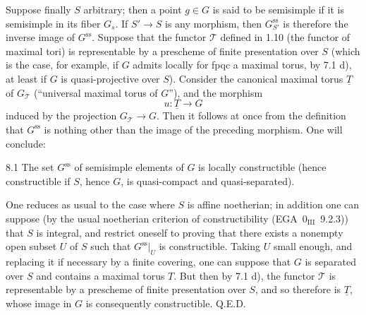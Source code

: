 Suppose finally $S$ arbitrary; then a point $g\in G$ is said to be semisimple if it is semisimple in its fiber $G_s$. If $S'\to S$ is any morphism, then $G^{\mathrm{ss}}_{S'}$ is therefore the inverse image of $G^{\mathrm{ss}}$. Suppose that the functor $\mathscr T$ defined in 1.10 (the functor of maximal tori) is representable by a prescheme of finite presentation over $S$ (which is the case, for example, if $G$ admits locally for fpqc a maximal torus, by 7.1 d), at least if $G$ is quasi-projective over $S$). Consider the canonical maximal torus $\underline T$ of $G_{\mathscr T}$ (``universal maximal torus of $G$''), and the morphism
\[
u:\underline T\to G
\]
induced by the projection $G_{\mathscr T}\to G$. Then it follows at once from the definition that $G^{\mathrm{ss}}$ is nothing other than the image of the preceding morphism. One will conclude:
\begin{proposition}{8.1}\label{XII.8.1}
The set $G^{\mathrm{ss}}$ of semisimple elements of $G$ is locally constructible (hence constructible if $S$, hence $G$, is quasi-compact and quasi-separated).
\end{proposition}
One reduces as usual to the case where $S$ is affine noetherian; in addition one can suppose (by the usual noetherian criterion of constructibility (EGA~$0_{\mathrm{III}}$~9.2.3)) that $S$ is integral, and restrict oneself to proving that there exists a nonempty open subset $U$ of $S$ such that $G^{\mathrm{ss}}|_U$ is constructible. Taking $U$ small enough, and replacing it if necessary by a finite covering, one can suppose that $G$ is separated over $S$ and contains a maximal torus $T$. But then by 7.1 d), the functor $\mathscr T$ is representable by a prescheme of finite presentation over $S$, and so therefore is $\underline T$, whose image in $G$ is consequently constructible. \hfill Q.E.D.

